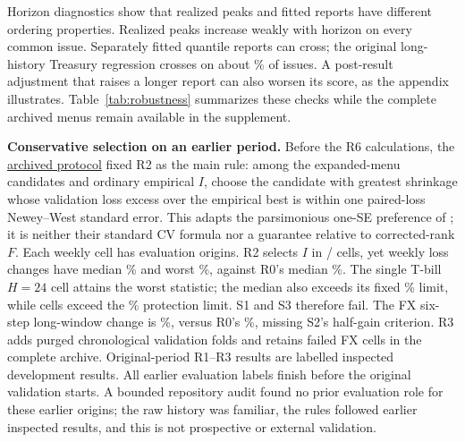 Horizon diagnostics show that realized peaks and fitted reports have different ordering properties. Realized peaks increase weakly with horizon on every common issue. Separately fitted quantile reports can cross; the original long-history Treasury regression crosses on about \TreasuryHorizonCrossing{}\% of issues. A post-result adjustment that raises a longer report can also worsen its score, as the appendix illustrates. Table~\ref{tab:robustness} summarizes these checks while the complete archived menus remain available in the supplement.



\textbf{Conservative selection on an earlier period.} Before the R6 calculations, the \href{https://github.com/ByronLi0207/financial-mathematics-paper-20261020/blob/6c0eef44c46a0ff525264b13ae1dae9b821ad3c2/protocol/supervisor-20261023/r6-design.md}{archived protocol} fixed R2 as the main rule: among the expanded-menu candidates and ordinary empirical $I$, choose the candidate with greatest shrinkage whose validation loss excess over the empirical best is within one paired-loss Newey--West standard error. This adapts the parsimonious one-SE preference of \citet{hastie2009}; it is neither their standard CV formula nor a guarantee relative to corrected-rank $F$. Each weekly cell has \RWritingWeeklyN{} evaluation origins. R2 selects $I$ in \RWritingISelected{}/\RWritingWeeklyCells{} cells, yet weekly loss changes have median \RWeeklyTwoMedian{}\% and worst \RWeeklyTwoWorst{}\%, against R0's median \RWeeklyZeroMedian{}\%. The single T-bill $H=24$ cell attains the worst statistic; the median also exceeds its fixed \RProtectionMedianLimit{}\% limit, while \RWeeklyTwoLargeLosses{} cells exceed the \RProtectionWorstLimit{}\% protection limit. S1 and S3 therefore fail. The FX six-step long-window change is \RFXLongTwoChange{}\%, versus R0's \RFXLongZeroChange{}\%, missing S2's half-gain criterion. R3 adds purged chronological validation folds and retains \RRetroFXFailedRows{} failed FX cells in the complete archive. Original-period R1--R3 results are labelled inspected development results. All earlier evaluation labels finish before the original validation starts. A bounded repository audit found no prior evaluation role for these earlier origins; the raw history was familiar, the rules followed earlier inspected results, and this is not prospective or external validation.

